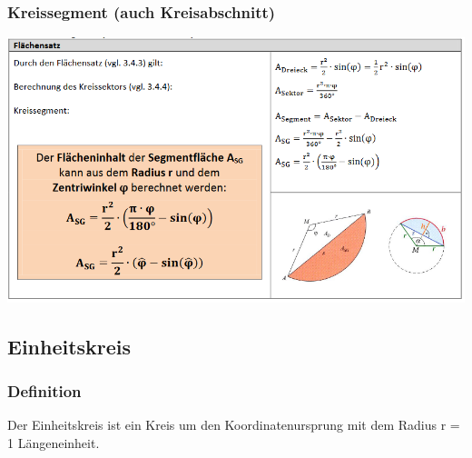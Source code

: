 \subsubsection{Kreissegment (auch Kreisabschnitt)}
\includegraphics[scale=0.7]{kreissegment.PNG}



\subsection{Einheitskreis}
\subsubsection{Definition}
Der Einheitskreis ist ein Kreis um den Koordinatenursprung mit dem Radius r = 1 Längeneinheit.
